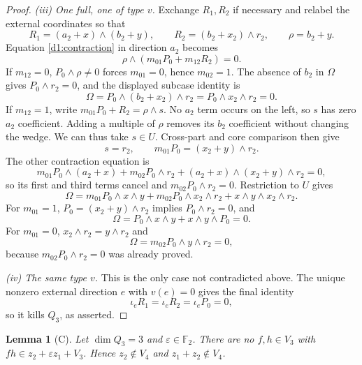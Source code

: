 \documentclass[11pt,a4paper]{article}
\theoremstyle{plain}
\newtheorem{lemma}[theorem]{Lemma}
\theoremstyle{remark}
\newcommand{\F}{\mathbb F_2}
\begin{document}
\begin{proof}
\emph{(iii) One full, one of type $v$.} Exchange $R_1,R_2$ if necessary and relabel the external coordinates so that
\[
R_1=(a_2+x)\wedge(b_2+y),\qquad R_2=(b_2+x_2)\wedge r_2,
\qquad\rho=b_2+y.
\]
Equation \eqref{d1:contraction} in direction $a_2$ becomes
\[
\rho\wedge(m_{01}P_0+m_{12}R_2)=0.
\]
If $m_{12}=0$, $P_0\wedge\rho\ne0$ forces $m_{01}=0$, hence $m_{02}=1$. The absence of $b_2$ in $\Omega$ gives $P_0\wedge r_2=0$, and the displayed subcase identity is
\[
\Omega=P_0\wedge(b_2+x_2)\wedge r_2=P_0\wedge x_2\wedge r_2=0.
\]
If $m_{12}=1$, write $m_{01}P_0+R_2=\rho\wedge s$. No $a_2$ term occurs on the left, so $s$ has zero $a_2$ coefficient. Adding a multiple of $\rho$ removes its $b_2$ coefficient without changing the wedge. We can thus take $s\in U$. Cross-part and core comparison then give
\[
s=r_2,\qquad m_{01}P_0=(x_2+y)\wedge r_2.
\]
The other contraction equation is
\[
m_{01}P_0\wedge(a_2+x)+m_{02}P_0\wedge r_2
+(a_2+x)\wedge(x_2+y)\wedge r_2=0,
\]
so its first and third terms cancel and $m_{02}P_0\wedge r_2=0$.
Restriction to $U$ gives
\[
\Omega=m_{01}P_0\wedge x\wedge y+m_{02}P_0\wedge x_2\wedge r_2
+x\wedge y\wedge x_2\wedge r_2.
\]
For $m_{01}=1$, $P_0=(x_2+y)\wedge r_2$ implies $P_0\wedge r_2=0$, and
\[
\Omega=P_0\wedge x\wedge y+x\wedge y\wedge P_0=0.
\]
For $m_{01}=0$, $x_2\wedge r_2=y\wedge r_2$ and
\[
\Omega=m_{02}P_0\wedge y\wedge r_2=0,
\]
because $m_{02}P_0\wedge r_2=0$ was already proved.

\emph{(iv) The same type $v$.} This is the only case not contradicted above. The unique nonzero external direction $e$ with $v(e)=0$ gives the final identity
\[
\iota_eR_1=\iota_eR_2=\iota_eP_0=0,
\]
so it kills $Q_3$, as asserted.
\end{proof}

\begin{lemma}[C]\label{l3:lem:C}
Let $\dim Q_3=3$ and $\varepsilon\in\F$. There are no $f,h\in V_3$ with $fh\in z_2+\varepsilon z_1+V_3$. Hence $z_2\notin V_4$ and $z_1+z_2\notin V_4$.
\end{lemma}
\end{document}
